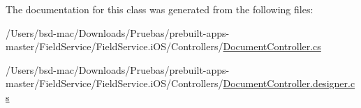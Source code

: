 The documentation for this class was generated from the following files\+:\begin{DoxyCompactItemize}
\item 
/\+Users/bsd-\/mac/\+Downloads/\+Pruebas/prebuilt-\/apps-\/master/\+Field\+Service/\+Field\+Service.\+i\+O\+S/\+Controllers/\hyperlink{_document_controller_8cs}{Document\+Controller.\+cs}\item 
/\+Users/bsd-\/mac/\+Downloads/\+Pruebas/prebuilt-\/apps-\/master/\+Field\+Service/\+Field\+Service.\+i\+O\+S/\+Controllers/\hyperlink{_document_controller_8designer_8cs}{Document\+Controller.\+designer.\+cs}\end{DoxyCompactItemize}
